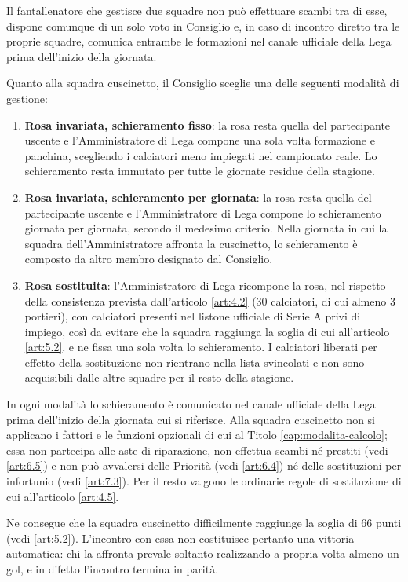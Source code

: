 Il fantallenatore che gestisce due squadre non può effettuare scambi tra di esse, dispone comunque di un solo voto in Consiglio e, in caso di incontro diretto tra le proprie squadre, comunica entrambe le formazioni nel canale ufficiale della Lega prima dell'inizio della giornata.

Quanto alla squadra cuscinetto, il Consiglio sceglie una delle seguenti modalità di gestione:

\begin{enumerate}
\item \textbf{Rosa invariata, schieramento fisso}: la rosa resta quella del partecipante uscente e l'Amministratore di Lega compone una sola volta formazione e panchina, scegliendo i calciatori meno impiegati nel campionato reale. Lo schieramento resta immutato per tutte le giornate residue della stagione.
\item \textbf{Rosa invariata, schieramento per giornata}: la rosa resta quella del partecipante uscente e l'Amministratore di Lega compone lo schieramento giornata per giornata, secondo il medesimo criterio. Nella giornata in cui la squadra dell'Amministratore affronta la cuscinetto, lo schieramento è composto da altro membro designato dal Consiglio.
\item \textbf{Rosa sostituita}: l'Amministratore di Lega ricompone la rosa, nel rispetto della consistenza prevista dall'articolo \ref{art:4.2} (30 calciatori, di cui almeno 3 portieri), con calciatori presenti nel listone ufficiale di Serie A privi di impiego, così da evitare che la squadra raggiunga la soglia di cui all'articolo \ref{art:5.2}, e ne fissa una sola volta lo schieramento. I calciatori liberati per effetto della sostituzione non rientrano nella lista svincolati e non sono acquisibili dalle altre squadre per il resto della stagione.
\end{enumerate}

In ogni modalità lo schieramento è comunicato nel canale ufficiale della Lega prima dell'inizio della giornata cui si riferisce. Alla squadra cuscinetto non si applicano i fattori e le funzioni opzionali di cui al Titolo \ref{cap:modalita-calcolo}; essa non partecipa alle aste di riparazione, non effettua scambi né prestiti (vedi \ref{art:6.5}) e non può avvalersi delle Priorità (vedi \ref{art:6.4}) né delle sostituzioni per infortunio (vedi \ref{art:7.3}). Per il resto valgono le ordinarie regole di sostituzione di cui all'articolo \ref{art:4.5}.

Ne consegue che la squadra cuscinetto difficilmente raggiunge la soglia di 66 punti (vedi \ref{art:5.2}). L'incontro con essa non costituisce pertanto una vittoria automatica: chi la affronta prevale soltanto realizzando a propria volta almeno un gol, e in difetto l'incontro termina in parità.

